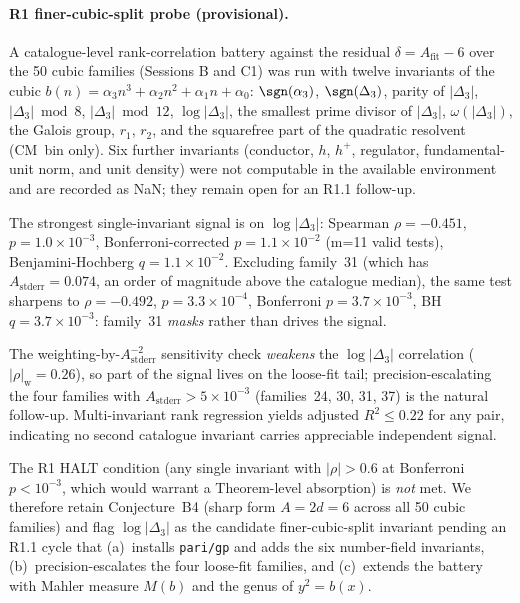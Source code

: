 
\paragraph{R1 finer-cubic-split probe (provisional).}
A catalogue-level rank-correlation battery against the residual
$\delta = A_{\mathrm{fit}} - 6$ over the 50 cubic families
(Sessions B and C1) was run with twelve invariants of the cubic
$b(n) = \alpha_3 n^3 + \alpha_2 n^2 + \alpha_1 n + \alpha_0$:
$\sgn(\alpha_3)$, $\sgn(\Delta_3)$, parity of $|\Delta_3|$,
$|\Delta_3| \bmod 8$, $|\Delta_3| \bmod 12$, $\log|\Delta_3|$,
the smallest prime divisor of $|\Delta_3|$, $\omega(|\Delta_3|)$,
the Galois group, $r_1$, $r_2$, and the squarefree part of the
quadratic resolvent (CM~bin only). Six further invariants
(conductor, $h$, $h^+$, regulator, fundamental-unit norm, and
unit density) were not computable in the available environment
and are recorded as NaN; they remain open for an R1.1 follow-up.

The strongest single-invariant signal is on $\log|\Delta_3|$:
Spearman $\rho = -0.451$, $p = 1.0 \times 10^{-3}$,
Bonferroni-corrected $p = 1.1\times 10^{-2}$ (m=11 valid tests),
Benjamini-Hochberg $q = 1.1\times 10^{-2}$. Excluding family~31
(which has $A_{\mathrm{stderr}} = 0.074$, an order of magnitude
above the catalogue median), the same test sharpens to
$\rho = -0.492$, $p = 3.3\times 10^{-4}$, Bonferroni $p = 3.7\times 10^{-3}$,
BH $q = 3.7\times 10^{-3}$: family~31 \emph{masks} rather than
drives the signal.

The weighting-by-$A_{\mathrm{stderr}}^{-2}$ sensitivity check
\emph{weakens} the $\log|\Delta_3|$ correlation
($|\rho|_{\mathrm{w}} = 0.26$), so part of the signal lives on
the loose-fit tail; precision-escalating the four families with
$A_{\mathrm{stderr}} > 5\times 10^{-3}$ (families~24, 30, 31, 37)
is the natural follow-up. Multi-invariant rank regression yields
adjusted $R^2 \le 0.22$ for any pair, indicating no second
catalogue invariant carries appreciable independent signal.

The R1 HALT condition (any single invariant with $|\rho|>0.6$ at
Bonferroni $p<10^{-3}$, which would warrant a Theorem-level
absorption) is \emph{not} met. We therefore retain Conjecture~B4
(sharp form $A = 2d = 6$ across all 50 cubic families) and flag
$\log|\Delta_3|$ as the candidate finer-cubic-split invariant
pending an R1.1 cycle that (a)~installs \texttt{pari/gp} and
adds the six number-field invariants, (b)~precision-escalates
the four loose-fit families, and (c)~extends the battery with
Mahler measure $M(b)$ and the genus of $y^2 = b(x)$.

